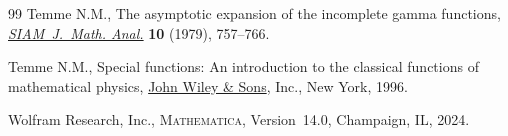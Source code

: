 \documentclass[pdftex]{sigma}
\numberwithin{equation}{section}
\begin{document}
\begin{thebibliography}{99}
Temme N.M., The asymptotic expansion of the incomplete gamma functions,
 \href{https://doi.org/10.1137/0510071}{\textit{SIAM~J.~Math. Anal.}} \textbf{10} (1979), 757--766.

Temme N.M., Special functions: {A}n introduction to the classical functions of
 mathematical physics, \href{https://doi.org/10.1002/9781118032572}{John Wiley \& Sons}, Inc., New York, 1996.

Wolfram Research, Inc., \textsc{Mathematica}, Version~14.0, Champaign, IL,
 2024.

\end{thebibliography}\LastPageEnding
\end{document}
